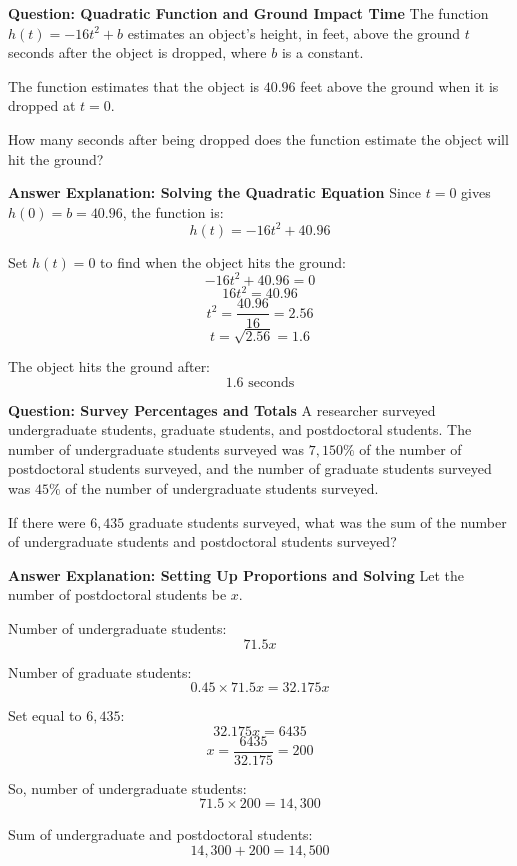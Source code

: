 \documentclass{beamer}
\begin{document}
\begin{frame}{\textbf{Question: Quadratic Function and Ground Impact Time}}
\small
The function $h(t) = -16t^2 + b$ estimates an object's height, in feet, above the ground $t$ seconds after the object is dropped, where $b$ is a constant.

The function estimates that the object is $40.96$ feet above the ground when it is dropped at $t = 0$.

How many seconds after being dropped does the function estimate the object will hit the ground?
\end{frame}

\begin{frame}{\textbf{Answer Explanation: Solving the Quadratic Equation}}
\small
Since $t = 0$ gives $h(0) = b = 40.96$, the function is:
\[
h(t) = -16t^2 + 40.96
\]

Set $h(t) = 0$ to find when the object hits the ground:
\[
-16t^2 + 40.96 = 0
\]
\[
16t^2 = 40.96
\]
\[
t^2 = \frac{40.96}{16} = 2.56
\]
\[
t = \sqrt{2.56} = 1.6
\]

The object hits the ground after:
\[
\boxed{1.6} \text{ seconds}
\]
\end{frame}


\begin{frame}{\textbf{Question: Survey Percentages and Totals}}
\small
A researcher surveyed undergraduate students, graduate students, and postdoctoral students. The number of undergraduate students surveyed was $7,150\%$ of the number of postdoctoral students surveyed, and the number of graduate students surveyed was $45\%$ of the number of undergraduate students surveyed.

If there were $6,435$ graduate students surveyed, what was the sum of the number of undergraduate students and postdoctoral students surveyed?
\end{frame}

\begin{frame}{\textbf{Answer Explanation: Setting Up Proportions and Solving}}
\small
Let the number of postdoctoral students be $x$.

Number of undergraduate students:
\[
71.5x
\]

Number of graduate students:
\[
0.45 \times 71.5x = 32.175x
\]

Set equal to $6,435$:
\[
32.175x = 6435
\]
\[
x = \frac{6435}{32.175} = 200
\]

So, number of undergraduate students:
\[
71.5 \times 200 = 14,300
\]

Sum of undergraduate and postdoctoral students:
\[
14,300 + 200 = \boxed{14,500}
\]
\end{frame}
\end{document}
